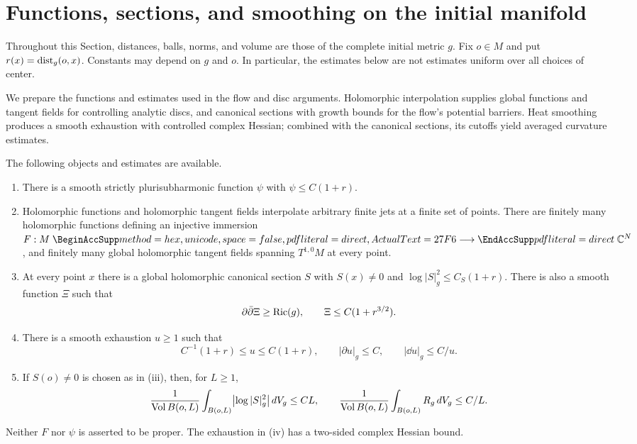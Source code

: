 \section{Functions, sections, and smoothing on the initial manifold}
\label{sec:preliminaries}

Throughout this Section, distances, balls, norms, and volume are those of
the complete initial metric $g$.  Fix $o\in M$ and put $r(x)=\operatorname{dist}_g(o,x)$.
Constants may depend on $g$ and $o$.  In particular, the estimates below
are not estimates uniform over all choices of center.

We prepare the functions and estimates used in the flow and disc
arguments.  Holomorphic interpolation supplies global functions and
tangent fields for controlling analytic discs, and canonical sections
with growth bounds for the flow's potential barriers.  Heat smoothing
produces a smooth exhaustion with controlled complex Hessian; combined
with the canonical sections, its cutoffs yield averaged curvature
estimates.

\begin{proposition}\label{prop:initial-data}
The following objects and estimates are available.
\begin{enumerate}[label=\textup{(\roman*)}]
\item There is a smooth strictly plurisubharmonic function $\psi$ with
      $\psi\le C(1+r)$.
\item Holomorphic functions and holomorphic tangent fields interpolate
      arbitrary finite jets at a finite set of points.  There are finitely
      many holomorphic functions defining an injective immersion
      $F:M\longrightarrow\C^N$, and finitely many global holomorphic
      tangent fields spanning $T^{1,0}M$ at every point.
\item At every point $x$ there is a global holomorphic canonical section
      $S$ with $S(x)\ne0$ and
      $\log|S|_g^2\le C_S(1+r)$.  There is also a smooth function $\Xi$
      such that
      \begin{equation}\label{prelim:xi}
      \partial\bar\partial\Xi\ge\operatorname{Ric}(g),\qquad \Xi\le C(1+r^{3/2}).
      \end{equation}
\item There is a smooth exhaustion $u\ge1$ such that
      \begin{equation}\label{prelim:exhaustion}
      C^{-1}(1+r)\le u\le C(1+r),\qquad
      |\partial u|_g\le C,\qquad |\dd u|_g\le C/u.
      \end{equation}
\item If $S(o)\ne0$ is chosen as in \textup{(iii)}, then, for $L\ge1$,
      \begin{equation}\label{prelim:averages}
      \frac{1}{\operatorname{Vol} B(o,L)}\int_{B(o,L)}
           \bigl|\log|S|_g^2\bigr|\,dV_g\le CL,
      \qquad
      \frac{1}{\operatorname{Vol} B(o,L)}\int_{B(o,L)}R_g\,dV_g\le C/L.
      \end{equation}
\end{enumerate}
Neither $F$ nor $\psi$ is asserted to be proper.  The exhaustion in
\textup{(iv)} has a two-sided complex Hessian bound.
\end{proposition}

